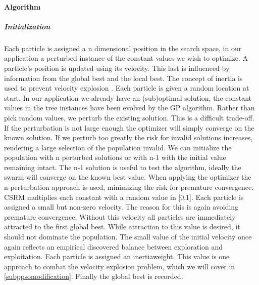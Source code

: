 \paragraph{Algorithm}
\subparagraph{Initialization}
Each particle is assigned a n dimensional position in the search space, in our application a perturbed instance of the constant values we wish to optimize. A particle's position is updated using its velocity. This last is influenced by information from the global best and the local best. The concept of inertia is used to prevent velocity explosion \cite{PSOExplosion}.
Each particle is given a random location at start. In our application we already have an (sub)optimal solution, the constant values in the tree instances have been evolved by the GP algorithm. Rather than pick random values, we perturb the existing solution. This is a difficult trade-off. If the perturbation is not large enough the optimizer will simply converge on the known solution. If we perturb too greatly the risk for invalid solutions increases, rendering a large selection of the population invalid. We can initialize the population with n perturbed solutions or with n-1 with the initial value remaining intact. The n-1 solution is useful to test the algorithm, ideally the swarm will converge on the known best value. When applying the optimizer the n-perturbation approach is used, minimizing the risk for premature convergence.
CSRM multiplies each constant with a random value in [0,1].
Each particle is assigned a small but non-zero velocity. The reason for this is again avoiding premature convergence. Without this velocity all particles are immediately attracted to the first global best. While attraction to this value is desired, it should not dominate the population. The small value of the initial velocity once again reflects an empirical discovered balance between exploration and exploitation.
Each particle is assigned an inertiaweight.
This value is one approach to combat the velocity explosion problem, which we will cover in \ref{subppsomodification}. 
Finally the global best is recorded. 



